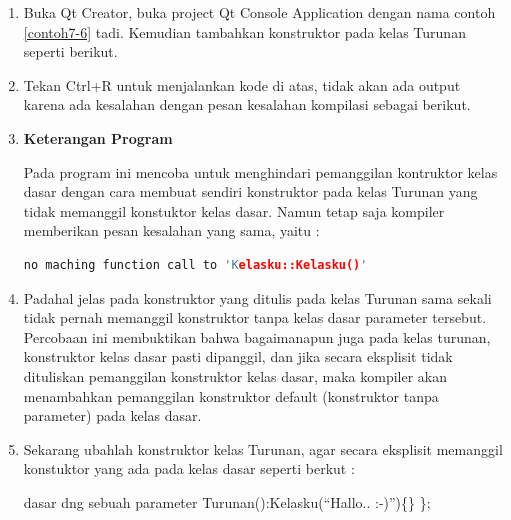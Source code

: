 \begin{enumerate}

\item
 Buka Qt Creator, buka project Qt Console Application dengan nama
 contoh \ref{contoh7-6} tadi. Kemudian tambahkan konstruktor pada kelas Turunan
 seperti berikut.




\item
 Tekan Ctrl+R untuk menjalankan kode di atas, tidak akan ada output
 karena ada kesalahan dengan pesan kesalahan kompilasi sebagai berikut.

 \begin{figure}[htbp]
 \centering
{}

 \end{figure}

\item \textbf{Keterangan Program}

Pada program ini mencoba untuk menghindari pemanggilan kontruktor kelas
dasar dengan cara membuat sendiri konstruktor pada kelas Turunan yang
tidak memanggil konstuktor kelas dasar. Namun tetap saja kompiler
memberikan pesan kesalahan yang sama, yaitu :

\begin{lstlisting}[language=c++, numbers=none]
no maching function call to 'Kelasku::Kelasku()'
\end{lstlisting}

\item Padahal jelas pada konstruktor yang ditulis pada kelas Turunan sama
sekali tidak pernah memanggil konstruktor tanpa kelas dasar parameter
tersebut. Percobaan ini membuktikan bahwa bagaimanapun juga pada kelas
turunan, konstruktor kelas dasar pasti dipanggil, dan jika secara
eksplisit tidak dituliskan pemanggilan konstruktor kelas dasar, maka
kompiler akan menambahkan pemanggilan konstruktor default (konstruktor
tanpa parameter) pada kelas dasar.


\item
 Sekarang ubahlah konstruktor kelas Turunan, agar secara eksplisit
 memanggil konstuktor yang ada pada kelas dasar seperti berkut :


dasar dng sebuah parameter Turunan():Kelasku(``Hallo.. :-)'')\{\} \};
\end{enumerate}

